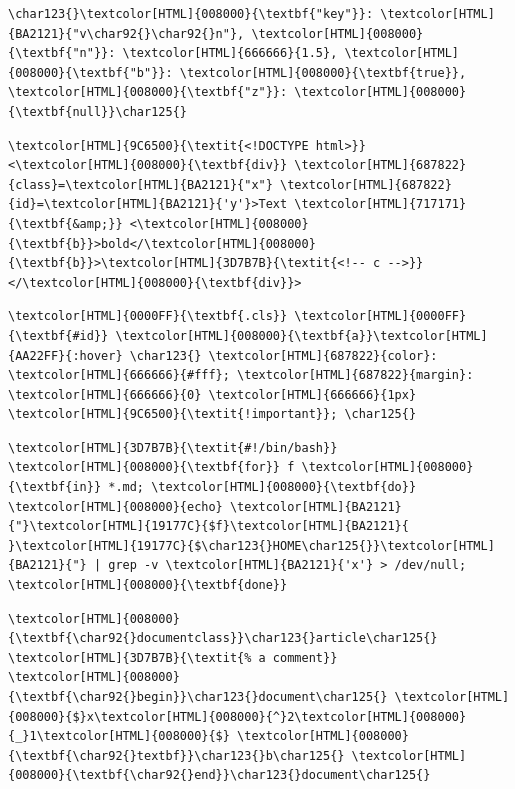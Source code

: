 \begin{Verbatim}[commandchars=\\\{\}]
\char123{}\textcolor[HTML]{008000}{\textbf{"key"}}: \textcolor[HTML]{BA2121}{"v\char92{}\char92{}n"}, \textcolor[HTML]{008000}{\textbf{"n"}}: \textcolor[HTML]{666666}{1.5}, \textcolor[HTML]{008000}{\textbf{"b"}}: \textcolor[HTML]{008000}{\textbf{true}}, \textcolor[HTML]{008000}{\textbf{"z"}}: \textcolor[HTML]{008000}{\textbf{null}}\char125{}
\end{Verbatim}

\begin{Verbatim}[commandchars=\\\{\}]
\textcolor[HTML]{9C6500}{\textit{<!DOCTYPE html>}}
<\textcolor[HTML]{008000}{\textbf{div}} \textcolor[HTML]{687822}{class}=\textcolor[HTML]{BA2121}{"x"} \textcolor[HTML]{687822}{id}=\textcolor[HTML]{BA2121}{'y'}>Text \textcolor[HTML]{717171}{\textbf{&amp;}} <\textcolor[HTML]{008000}{\textbf{b}}>bold</\textcolor[HTML]{008000}{\textbf{b}}>\textcolor[HTML]{3D7B7B}{\textit{<!-- c -->}}</\textcolor[HTML]{008000}{\textbf{div}}>
\end{Verbatim}

\begin{Verbatim}[commandchars=\\\{\}]
\textcolor[HTML]{0000FF}{\textbf{.cls}} \textcolor[HTML]{0000FF}{\textbf{#id}} \textcolor[HTML]{008000}{\textbf{a}}\textcolor[HTML]{AA22FF}{:hover} \char123{} \textcolor[HTML]{687822}{color}: \textcolor[HTML]{666666}{#fff}; \textcolor[HTML]{687822}{margin}: \textcolor[HTML]{666666}{0} \textcolor[HTML]{666666}{1px} \textcolor[HTML]{9C6500}{\textit{!important}}; \char125{}
\end{Verbatim}

\begin{Verbatim}[commandchars=\\\{\}]
\textcolor[HTML]{3D7B7B}{\textit{#!/bin/bash}}
\textcolor[HTML]{008000}{\textbf{for}} f \textcolor[HTML]{008000}{\textbf{in}} *.md; \textcolor[HTML]{008000}{\textbf{do}} \textcolor[HTML]{008000}{echo} \textcolor[HTML]{BA2121}{"}\textcolor[HTML]{19177C}{$f}\textcolor[HTML]{BA2121}{ }\textcolor[HTML]{19177C}{$\char123{}HOME\char125{}}\textcolor[HTML]{BA2121}{"} | grep -v \textcolor[HTML]{BA2121}{'x'} > /dev/null; \textcolor[HTML]{008000}{\textbf{done}}
\end{Verbatim}

\begin{Verbatim}[commandchars=\\\{\}]
\textcolor[HTML]{008000}{\textbf{\char92{}documentclass}}\char123{}article\char125{} \textcolor[HTML]{3D7B7B}{\textit{% a comment}}
\textcolor[HTML]{008000}{\textbf{\char92{}begin}}\char123{}document\char125{} \textcolor[HTML]{008000}{$}x\textcolor[HTML]{008000}{^}2\textcolor[HTML]{008000}{_}1\textcolor[HTML]{008000}{$} \textcolor[HTML]{008000}{\textbf{\char92{}textbf}}\char123{}b\char125{} \textcolor[HTML]{008000}{\textbf{\char92{}end}}\char123{}document\char125{}
\end{Verbatim}

